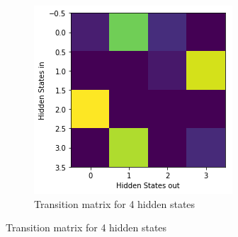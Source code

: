 \begin{figure}[H]
	\centering
	\begin{subfigure}[t]{0.3\textwidth}
		\includegraphics[width=\textwidth]{4x4Transition.png}
		\caption{Transition matrix for 4 hidden states}
	\end{subfigure}%

	\bigskip 


\end{figure}
